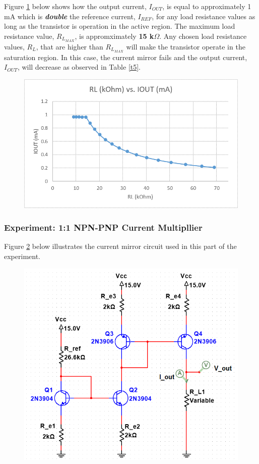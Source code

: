 \documentclass{article}
\begin{document}
	\pagebreak
	
	\noindent Figure \ref{f17} below shows how the output current, $I_{OUT}$, is equal to approximately 1 mA which is \textbf{\textit{double}} the reference current, $I_{REF}$, for any load resistance values as long as the transistor is operation in the active region.
	The maximum load resistance value, $R_{L_{MAX}}$, is appromximately \textbf{15 k$\Omega$}.
	Any chosen load resistance values, $R_L$, that are higher than $R_{L_{MAX}}$ will make the transistor operate in the saturation region.
	In this case, the current mirror fails and the output current, $I_{OUT}$, will decrease as observed in Table \ref{t5}.
	
	\begin{figure}[!ht]
		\centering
		\includegraphics[width=0.8\linewidth]{iout_vs_rl_1_2.png}
		\label{f17}
	\end{figure}
	
	\pagebreak
	
	\subsubsection{Experiment: 1:1 NPN-PNP Current Multipllier}
	Figure \ref{f18} below illustrates the current mirror circuit used in this part of the experiment.
	\begin{figure}[!ht]
		\centering
		\includegraphics[width=0.6\linewidth]{d1-part3-circuit-npn_pnp-1_1.png}
		\label{f18}
	\end{figure}
	
\end{document}
